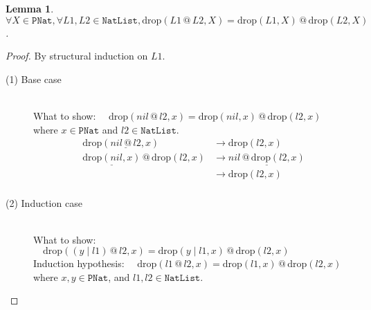 \documentclass[12pt, a4paper]{article}
\newtheorem{lemma}[theorem]{Lemma}
\newcommand{\rel}[1]{\mathrel{#1}}
\newcommand{\rmx}[1]{\mathrm{#1}}
\newcommand{\larrow}{\longrightarrow}
\newcommand{\under}{\underline}
\begin{document}
\begin{lemma}
\label{lm1}
$\forall X \in \mathtt{PNat}, \forall L1, L2 \in \mathtt{NatList}, \rmx{drop}(L1 \rel{@} L2, X) = \rmx{drop}(L1, X) \rel{@} \rmx{drop}(L2, X)$.
\end{lemma}
\begin{proof}
By structural induction on $L1$.

\begin{description}

\item[(1) Base case]~\\
\noindent
What to show: $\quad \rmx{drop}(nil \rel{@} l2, x) = \rmx{drop}(nil, x) \rel{@} \rmx{drop}(l2, x)$ \\
where $x \in \mathtt{PNat}$ and $l2 \in \mathtt{NatList}$.
\begin{align*}
\rmx{drop}(\under{nil \rel{@} l2}, x)
	&\larrow \rmx{drop}(l2, x) \tag{by @1} \\
\under{\rmx{drop}(nil, x)} \rel{@} \rmx{drop}(l2, x)
	&\larrow \under{nil \rel{@} \rmx{drop}(l2, x)} \tag{by drop1} \\
	&\larrow \rmx{drop}(l2, x) \tag{by @1} \\
\end{align*}

\item[(2) Induction case]~\\
What to show: $\quad \rmx{drop}((y \rel{|} l1) \rel{@} l2, x) = \rmx{drop}(y \rel{|} l1, x) \rel{@} \rmx{drop}(l2, x)$ \\
Induction hypothesis: $\quad \rmx{drop}(l1 \rel{@} l2, x) = \rmx{drop}(l1, x) \rel{@} \rmx{drop}(l2, x)$ \\
where $x, y \in \mathtt{PNat}$, and $l1, l2 \in \mathtt{NatList}$.


\end{description}
\end{proof}
\end{document}
